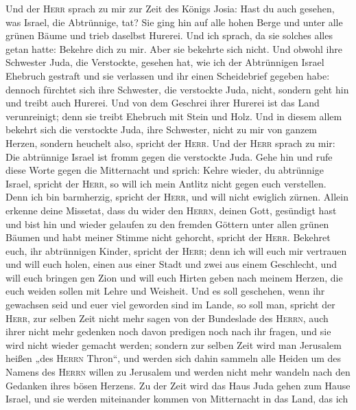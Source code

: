  Und der \textsc{Herr} sprach zu mir zur Zeit des Königs
Josia: Hast du auch gesehen, was Israel, die Abtrünnige, tat? Sie ging
hin auf alle hohen Berge und unter alle grünen Bäume und trieb daselbst
Hurerei.  Und ich sprach, da sie solches alles getan
hatte: Bekehre dich zu mir. Aber sie bekehrte sich nicht. Und obwohl
ihre Schwester Juda, die Verstockte, gesehen hat,  wie ich
der Abtrünnigen Israel Ehebruch gestraft und sie verlassen und ihr einen
Scheidebrief gegeben habe: dennoch fürchtet sich ihre Schwester, die
verstockte Juda, nicht, sondern geht hin und treibt auch Hurerei.
 Und von dem Geschrei ihrer Hurerei ist das Land
verunreinigt; denn sie treibt Ehebruch mit Stein und Holz.
 Und in diesem allem bekehrt sich die verstockte Juda,
ihre Schwester, nicht zu mir von ganzem Herzen, sondern heuchelt also,
spricht der \textsc{Herr}.  Und der \textsc{Herr} sprach
zu mir: Die abtrünnige Israel ist fromm gegen die verstockte Juda.
 Gehe hin und rufe diese Worte gegen die Mitternacht und
sprich: Kehre wieder, du abtrünnige Israel, spricht der \textsc{Herr},
so will ich mein Antlitz nicht gegen euch verstellen. Denn ich bin
barmherzig, spricht der \textsc{Herr}, und will nicht ewiglich zürnen.
 Allein erkenne deine Missetat, dass du wider den
\textsc{Herrn}, deinen Gott, gesündigt hast und bist hin und wieder
gelaufen zu den fremden Göttern unter allen grünen Bäumen und habt
meiner Stimme nicht gehorcht, spricht der \textsc{Herr}. 
Bekehret euch, ihr abtrünnigen Kinder, spricht der \textsc{Herr}; denn
ich will euch mir vertrauen und will euch holen, einen aus einer Stadt
und zwei aus einem Geschlecht, und will euch bringen gen Zion
 und will euch Hirten geben nach meinem Herzen, die euch
weiden sollen mit Lehre und Weisheit.  Und es soll
geschehen, wenn ihr gewachsen seid und euer viel geworden sind im Lande,
so soll man, spricht der \textsc{Herr}, zur selben Zeit nicht mehr sagen
von der Bundeslade des \textsc{Herrn}, auch ihrer nicht mehr gedenken
noch davon predigen noch nach ihr fragen, und sie wird nicht wieder
gemacht werden;  sondern zur selben Zeit wird man
Jerusalem heißen „des \textsc{Herrn} Thron``, und werden sich dahin
sammeln alle Heiden um des Namens des \textsc{Herrn} willen zu Jerusalem
und werden nicht mehr wandeln nach den Gedanken ihres bösen Herzens.
 Zu der Zeit wird das Haus Juda gehen zum Hause Israel,
und sie werden miteinander kommen von Mitternacht in das Land, das ich
